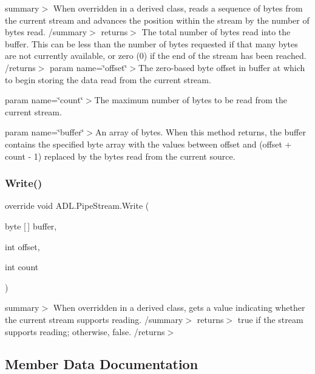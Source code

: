 summary$>$ When overridden in a derived class, reads a sequence of bytes from the current stream and advances the position within the stream by the number of bytes read. /summary$>$ returns$>$ The total number of bytes read into the buffer. This can be less than the number of bytes requested if that many bytes are not currently available, or zero (0) if the end of the stream has been reached. /returns$>$ param name=\char`\"{}offset\char`\"{}$>$The zero-\/based byte offset in buffer at which to begin storing the data read from the current stream. 

param name=\char`\"{}count\char`\"{}$>$The maximum number of bytes to be read from the current stream. 

param name=\char`\"{}buffer\char`\"{}$>$An array of bytes. When this method returns, the buffer contains the specified byte array with the values between offset and (offset + count -\/ 1) replaced by the bytes read from the current source. \mbox{\label{class_a_d_l_1_1_pipe_stream_a5f8e6e0a0b7070fc2e5320d2007eadd1}} 
\subsubsection{\texorpdfstring{Write()}{Write()}}
{\footnotesize\ttfamily override void A\+D\+L.\+Pipe\+Stream.\+Write (\begin{DoxyParamCaption}\item[{byte \mbox{[}$\,$\mbox{]}}]{buffer,  }\item[{int}]{offset,  }\item[{int}]{count }\end{DoxyParamCaption})}

summary$>$ When overridden in a derived class, gets a value indicating whether the current stream supports reading. /summary$>$ returns$>$ true if the stream supports reading; otherwise, false. /returns$>$ 

\subsection{Member Data Documentation}
\mbox{\label{class_a_d_l_1_1_pipe_stream_a497552b08f4c042b6a9d2c6be350181e}} 
